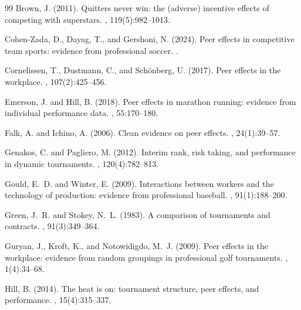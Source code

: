 \documentclass[12pt]{article}
\theoremstyle{definition}
\theoremstyle{remark}
\begin{document}
\begin{thebibliography}{99}
Brown, J. (2011).
\newblock Quitters never win: the (adverse) incentive effects of competing with superstars.
, 119(5):982--1013.

Cohen-Zada, D., Dayag, T., and Gershoni, N. (2024).
\newblock Peer effects in competitive team sports: evidence from professional soccer.
.

Cornelissen, T., Dustmann, C., and Sch\"{o}nberg, U. (2017).
\newblock Peer effects in the workplace.
, 107(2):425--456.

Emerson, J. and Hill, B. (2018).
\newblock Peer effects in marathon running: evidence from individual performance data.
, 55:170--180.

Falk, A. and Ichino, A. (2006).
\newblock Clean evidence on peer effects.
, 24(1):39--57.

Genakos, C. and Pagliero, M. (2012).
\newblock Interim rank, risk taking, and performance in dynamic tournaments.
, 120(4):782--813.

Gould, E.~D. and Winter, E. (2009).
\newblock Interactions between workers and the technology of production:
evidence from professional baseball.
, 91(1):188--200.

Green, J.~R. and Stokey, N.~L. (1983).
\newblock A comparison of tournaments and contracts.
, 91(3):349--364.

Guryan, J., Kroft, K., and Notowidigdo, M.~J. (2009).
\newblock Peer effects in the workplace: evidence from random groupings in professional golf tournaments.
, 1(4):34--68.

Hill, B. (2014).
\newblock The heat is on: tournament structure, peer effects, and performance.
, 15(4):315--337.


\end{thebibliography}
\end{document}
